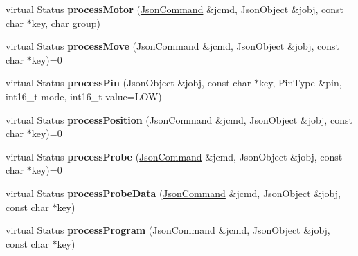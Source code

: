 \begin{DoxyCompactItemize}
\item 
\hypertarget{classfirestep_1_1_json_controller_a4b24a4eb2b560f67a2b05cfc6de0ffb8}{virtual Status {\bfseries process\+Motor} (\hyperlink{classfirestep_1_1_json_command}{Json\+Command} \&jcmd, Json\+Object \&jobj, const char $\ast$key, char group)}\label{classfirestep_1_1_json_controller_a4b24a4eb2b560f67a2b05cfc6de0ffb8}

\item 
\hypertarget{classfirestep_1_1_json_controller_aba71d8b07eb77cd80b0bb96d2a7d4c67}{virtual Status {\bfseries process\+Move} (\hyperlink{classfirestep_1_1_json_command}{Json\+Command} \&jcmd, Json\+Object \&jobj, const char $\ast$key)=0}\label{classfirestep_1_1_json_controller_aba71d8b07eb77cd80b0bb96d2a7d4c67}

\item 
\hypertarget{classfirestep_1_1_json_controller_ac3fd3ce1124de17ae8ff272a2dfaa2a9}{virtual Status {\bfseries process\+Pin} (Json\+Object \&jobj, const char $\ast$key, Pin\+Type \&pin, int16\+\_\+t mode, int16\+\_\+t value=L\+O\+W)}\label{classfirestep_1_1_json_controller_ac3fd3ce1124de17ae8ff272a2dfaa2a9}

\item 
\hypertarget{classfirestep_1_1_json_controller_ac0fc6e48c99ee31bf82b1915b2dade75}{virtual Status {\bfseries process\+Position} (\hyperlink{classfirestep_1_1_json_command}{Json\+Command} \&jcmd, Json\+Object \&jobj, const char $\ast$key)=0}\label{classfirestep_1_1_json_controller_ac0fc6e48c99ee31bf82b1915b2dade75}

\item 
\hypertarget{classfirestep_1_1_json_controller_adf94382ea3d8cbd30ae8b10980b4bbb6}{virtual Status {\bfseries process\+Probe} (\hyperlink{classfirestep_1_1_json_command}{Json\+Command} \&jcmd, Json\+Object \&jobj, const char $\ast$key)=0}\label{classfirestep_1_1_json_controller_adf94382ea3d8cbd30ae8b10980b4bbb6}

\item 
\hypertarget{classfirestep_1_1_json_controller_ab8fa4e528e77669b5fb9fbd8078560de}{virtual Status {\bfseries process\+Probe\+Data} (\hyperlink{classfirestep_1_1_json_command}{Json\+Command} \&jcmd, Json\+Object \&jobj, const char $\ast$key)}\label{classfirestep_1_1_json_controller_ab8fa4e528e77669b5fb9fbd8078560de}

\item 
\hypertarget{classfirestep_1_1_json_controller_af184788b4e2fee1e820b8c2dd180e5c7}{virtual Status {\bfseries process\+Program} (\hyperlink{classfirestep_1_1_json_command}{Json\+Command} \&jcmd, Json\+Object \&jobj, const char $\ast$key)}\label{classfirestep_1_1_json_controller_af184788b4e2fee1e820b8c2dd180e5c7}


\end{DoxyCompactItemize}
